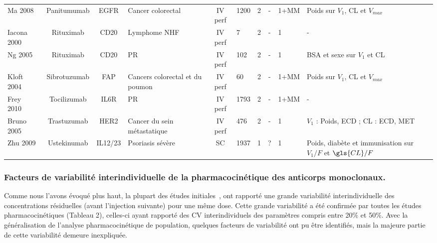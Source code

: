 \begin{table}[!ht]
\begin{tiny}
\begin{tabular}{p{1.1cm}ccp{1.7cm}cp{.9cm}p{.8cm}cp{.7cm}p{2.1cm}}
      Ma 2008~\citep{REF73} & Panitumumab & EGFR & Cancer colorectal & \gls{IV} perf & 1200 & 2 & - & 1+MM & Poids sur $V_1$, \gls{CL} et $V_{max}$ \\
      Iacona 2000~\citep{REF51} & Rituximab & CD20 & Lymphome NHF & \gls{IV} perf & 7 & 2 & - & 1 & - \\
      Ng 2005~\citep{REF52} & Rituximab & CD20 & PR & \gls{IV} perf & 102 & 2 & - & 1 & BSA et sexe sur $V_1$ et \gls{CL} \\
      Kloft 2004~\citep{REF74} & Sibrotuzumab & FAP & Cancers colorectal et du poumon & \gls{IV} perf & 60 & 2 & - & 1+MM & Poids sur $V_1$,  \gls{CL} et $V_{max}$ \\
      Frey 2010~\citep{REF75} & Tocilizumab & IL6R & PR & \gls{IV} perf & 1793 & 2 & - & 1+MM & - \\
      Bruno 2005~\citep{REF76} & Trastuzumab & HER2 & Cancer du sein métastatique & \gls{IV} perf & 476 & 2 & - & 1 & $V_1$ : Poids, ECD ; \gls{CL} : ECD, MET \\
      Zhu 2009~\citep{REF77} & Ustekinumab & IL12/23 & Psoriasis sévère & SC & 1937 & 1 & ? & 1 & Poids, diabète et immunisation sur $V_1/F$ et $\gls{CL}/F$ \\
      \hline
    \end{tabular}
  \label{tab:2}
\end{tiny}
\end{table}

\subsubsection{Facteurs de variabilité interindividuelle de la pharmacocinétique des anticorps monoclonaux.}
Comme nous l'avons évoqué plus haut, la plupart des études initiales~\citep{REF53, REF54, REF58, REF60}, ont rapporté une grande variabilité interindividuelle des concentrations résiduelles (avant l'injection suivante) pour une même dose. Cette grande variabilité a été confirmée par toutes les études pharmacocinétiques (Tableau 2), celles-ci ayant rapporté des CV interindividuels des paramètres compris entre 20\% et 50\%. Avec la généralisation de l'analyse pharmacocinétique de population, quelques facteurs de variabilité ont pu être identifiés, mais la majeure partie de cette variabilité demeure inexpliquée.
